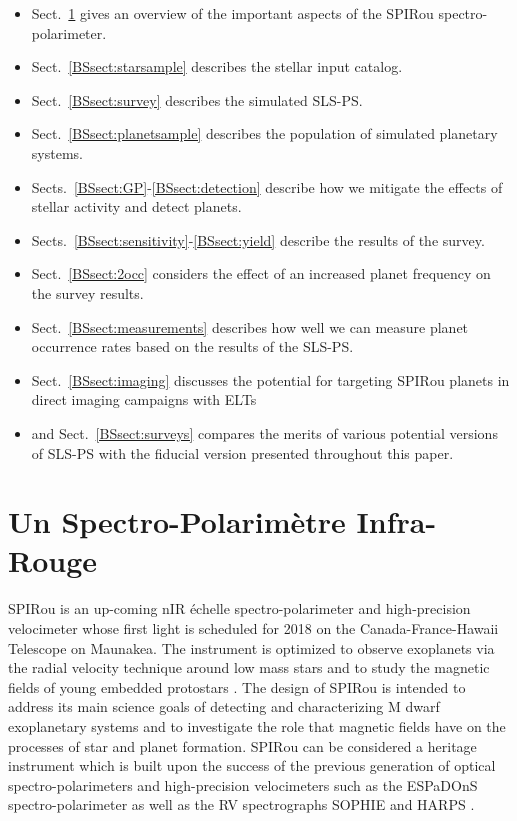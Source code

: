\begin{itemize}
\item Sect.~\ref{BSsect:spirou} gives an overview of the important aspects of the
  SPIRou spectro-polarimeter.
\item Sect.~\ref{BSsect:starsample} describes the stellar input catalog.
\item Sect.~\ref{BSsect:survey} describes the simulated SLS-PS.
\item Sect.~\ref{BSsect:planetsample} describes the population of simulated
  planetary systems. 
\item Sects.~\ref{BSsect:GP}-\ref{BSsect:detection} describe how we mitigate the
  effects of stellar activity and detect planets.
\item Sects.~\ref{BSsect:sensitivity}-\ref{BSsect:yield} describe the results of
  the survey.
\item Sect.~\ref{BSsect:2occ} considers the effect of an increased planet frequency
  on the survey results.
\item Sect.~\ref{BSsect:measurements} describes how well we can measure
  planet occurrence rates based on the results of the SLS-PS.
\item Sect.~\ref{BSsect:imaging} discusses the potential for targeting SPIRou
  planets in direct imaging campaigns with ELTs
\item and Sect.~\ref{BSsect:surveys} compares the merits of various potential
  versions of SLS-PS with the fiducial version presented throughout this paper.
\end{itemize}

\section{Un Spectro-Polarim\`{e}tre Infra-Rouge} \label{BSsect:spirou}
SPIRou is an up-coming nIR \'echelle spectro-polarimeter and high-precision velocimeter whose first
light is scheduled for 2018 on the Canada-France-Hawaii Telescope on Maunakea.
The instrument is optimized to observe exoplanets via the radial
velocity technique around low mass stars and to study the magnetic fields of young embedded protostars
\citep{delfosse13}. 
The design of SPIRou is intended to address its main science goals of detecting and characterizing
M dwarf exoplanetary systems and to investigate the role that magnetic fields have on the processes of
star and planet formation. SPIRou can be considered a heritage instrument which is built upon the success
of the previous generation of optical spectro-polarimeters and high-precision velocimeters such as the ESPaDOnS
spectro-polarimeter \citep{donati06} as well as the RV spectrographs SOPHIE \citep{bouchy06}
and HARPS \citep{mayor03}. \\

